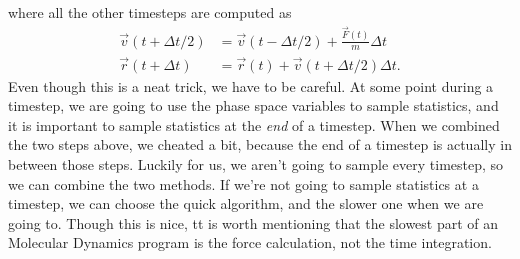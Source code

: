 where all the other timesteps are computed as
\begin{align}
	\vec v(t + \Delta t/2) &= \vec v(t - \Delta t/2) + \frac{\vec F(t)}{m}\Delta t\\
	\vec r(t + \Delta t) &= \vec r(t) + \vec v(t + \Delta t/2)\Delta t.
\end{align}
Even though this is a neat trick, we have to be careful. At some point during a timestep, we are going to use the phase space variables to sample statistics, and it is important to sample statistics at the \textit{end} of a timestep. When we combined the two steps above, we cheated a bit, because the end of a timestep is actually in between those steps. Luckily for us, we aren't going to sample every timestep, so we can combine the two methods. If we're not going to sample statistics at a timestep, we can choose the quick algorithm, and the slower one when we are going to. Though this is nice, tt is worth mentioning that the slowest part of an Molecular Dynamics program is the force calculation, not the time integration. 